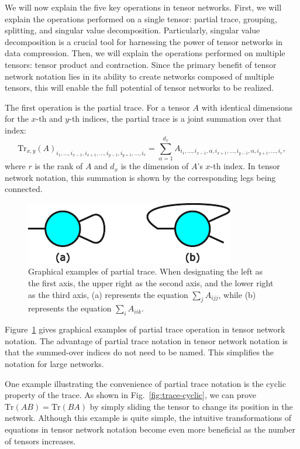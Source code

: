 \documentclass[12pt,dvipdfmx,twoside,openright]{report}
\begin{document}
We will now explain the five key operations in tensor networks.
First, we will explain the operations performed on a single tensor: partial trace, grouping, splitting, and singular value decomposition.
Particularly, singular value decomposition is a crucial tool for harnessing the power of tensor networks in data compression.
Then, we will explain the operations performed on multiple tensors: tensor product and contraction.
Since the primary benefit of tensor network notation lies in its ability to create networks composed of multiple tensors, this will enable the full potential of tensor networks to be realized.

The first operation is the partial trace.
For a tensor $A$ with identical dimensions for the $x$-th and $y$-th indices, the partial trace is a joint summation over that index:
\begin{equation}
    \mathrm{Tr}_{x,y}(A)_{i_1,\dots,i_{x-1},i_{x+1},\dots,i_{y-1},i_{y+1},\dots,i_r}=\sum_{\alpha=1}^{d_x} A_{i_1,\dots,i_{x-1},\alpha,i_{x+1},\dots,i_{y-1},\alpha,i_{y+1},\dots,i_r},
\end{equation}
where $r$ is the rank of $A$ and $d_x$ is the dimension of $A$'s $x$-th index.
In tensor network notation, this summation is shown by the corresponding legs being connected.

\begin{figure}
    \centering
    \includegraphics[width=0.4\linewidth]{fig-trace.pdf}
    \caption{Graphical examples of partial trace.
    When designating the left as the first axis, the upper right as the second axis, and the lower right as the third axis, (a) represents the equation $\sum_j A_{ijj}$, while (b) represents the equation $\sum_i A_{iik}$.}
    \label{fig:trace}
\end{figure}

Figure~\ref{fig:trace} gives graphical examples of partial trace operation in tensor network notation.
The advantage of partial trace notation in tensor network notation is that the summed-over indices do not need to be named.
This simplifies the notation for large networks.

One example illustrating the convenience of partial trace notation is the cyclic property of the trace.
As shown in Fig.~\ref{fig:trace-cyclic}, we can prove $\mathrm{Tr}(AB)=\mathrm{Tr}(BA)$ by simply sliding the tensor to change its position in the network.
Although this example is quite simple, the intuitive transformations of equations in tensor network notation become even more beneficial as the number of tensors increases.
\end{document}
